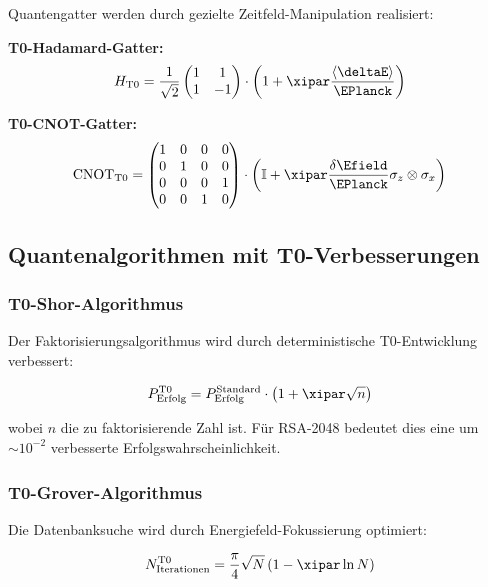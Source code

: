 	Quantengatter werden durch gezielte Zeitfeld-Manipulation realisiert:
	
	\textbf{T0-Hadamard-Gatter:}
	\begin{equation}
		H_{\text{T0}} = \frac{1}{\sqrt{2}}\begin{pmatrix} 1 & 1 \\ 1 & -1 \end{pmatrix} \cdot \left(1 + \xipar \frac{\langle\deltaE\rangle}{\EPlanck}\right)
	\end{equation}
	
	\textbf{T0-CNOT-Gatter:}
	\begin{equation}
		\text{CNOT}_{\text{T0}} = \begin{pmatrix} 1 & 0 & 0 & 0 \\ 0 & 1 & 0 & 0 \\ 0 & 0 & 0 & 1 \\ 0 & 0 & 1 & 0 \end{pmatrix} \cdot \left(\mathbb{I} + \xipar \frac{\delta\Efield}{\EPlanck} \sigma_z \otimes \sigma_x\right)
	\end{equation}
	
	\subsection{Quantenalgorithmen mit T0-Verbesserungen}
	
	\subsubsection{T0-Shor-Algorithmus}
	
	Der Faktorisierungsalgorithmus wird durch deterministische T0-Entwicklung verbessert:
	
	\begin{equation}
		P_{\text{Erfolg}}^{\text{T0}} = P_{\text{Erfolg}}^{\text{Standard}} \cdot \left(1 + \xipar \sqrt{n}\right)
	\end{equation}
	
	wobei $n$ die zu faktorisierende Zahl ist. Für RSA-2048 bedeutet dies eine um $\sim 10^{-2}$ verbesserte Erfolgswahrscheinlichkeit.
	
	\subsubsection{T0-Grover-Algorithmus}
	
	Die Datenbanksuche wird durch Energiefeld-Fokussierung optimiert:
	
	\begin{equation}
		N_{\text{Iterationen}}^{\text{T0}} = \frac{\pi}{4}\sqrt{N} \left(1 - \xipar \ln N\right)
	\end{equation}
	

